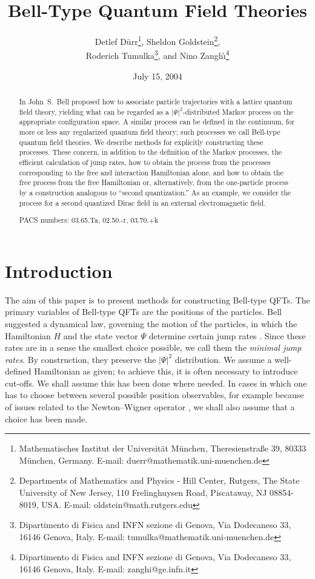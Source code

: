 \documentclass[12pt]{article}
\title{Bell-Type Quantum Field Theories}
\author{
   Detlef D\"urr\footnote{Mathematisches Institut der Universit\"{a}t
         M\"{u}nchen, Theresienstra{\ss}e 39, 80333 M\"{u}nchen, Germany.
         E-mail: duerr@mathematik.uni-muenchen.de},
   Sheldon Goldstein\footnote{Departments of Mathematics and Physics -
         Hill Center, Rutgers, The State University of New Jersey,
         110 Frelinghuysen Road, Piscataway, NJ 08854-8019, USA.
         E-mail: oldstein@math.rutgers.edu},\\
   Roderich Tumulka\footnote{Dipartimento di Fisica and INFN sezione di
         Genova,
         Via Dodecaneso 33, 16146 Genova, Italy.
         E-mail: tumulka@mathematik.uni-muenchen.de}, and
   Nino Zangh\`\i\footnote{Dipartimento di Fisica and INFN sezione di
         Genova,
         Via Dodecaneso 33, 16146 Genova, Italy. E-mail: 
         zanghi@ge.infn.it}
}
\date{July 15, 2004}
\newcommand{\1}{\mathbf{1}} %
\begin{document}
\maketitle
\begin{abstract}
In \cite{BellBeables} John~S.~Bell proposed how to associate particle
trajectories with a lattice quantum field theory, yielding what can be
regarded as a $|\Psi|^2$-distributed Markov process on the appropriate
configuration space. A similar process can be defined in the
continuum, for more or less any regularized quantum field theory; such
processes we call Bell-type quantum field theories. We describe
methods for explicitly constructing these processes.  These concern,
in addition to the definition of the Markov processes, the efficient
calculation of jump rates, how to obtain the process from the
processes corresponding to the free and interaction Hamiltonian alone,
and how to obtain the free process from the free Hamiltonian or,
alternatively, from the one-particle process by a construction
analogous to ``second quantization.''  As an example, we consider the
process for a second quantized Dirac field in an external
electromagnetic field.

\medskip

\noindent PACS numbers:  
03.65.Ta, %
02.50.-r, %
03.70.+k %
\end{abstract}

\tableofcontents





\section{Introduction}

The aim of this paper is to present methods for constructing Bell-type
QFTs.  The primary variables of Bell-type QFTs are the positions of
the particles.  Bell suggested a dynamical law, governing the motion
of the particles, in which the Hamiltonian $H$ and the state vector
$\Psi$ determine certain jump rates \cite{BellBeables}.  Since these
rates are in a sense the smallest choice possible, we call them the
\emph{minimal jump rates}.  By construction, they preserve the
$|\Psi|^2$ distribution.  We assume a well-defined Hamiltonian as
given; to achieve this, it is often necessary to introduce
cut-offs. We shall assume this has been done where needed.  In cases
in which one has to choose between several possible position
observables, for example because of issues related to the
Newton--Wigner operator \cite{NewtonWigner,Haag}, we shall also assume
that a choice has been made.
\end{document}
